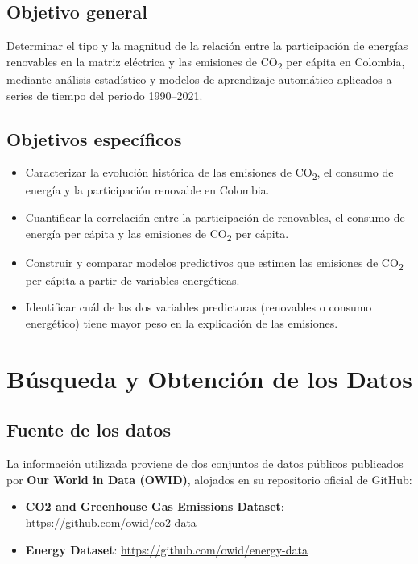 \documentclass[11pt]{article}
\begin{document}
\subsection*{Objetivo general}
Determinar el tipo y la magnitud de la relación entre la participación de energías renovables en la matriz eléctrica y las emisiones de CO\textsubscript{2} per cápita en Colombia, mediante análisis estadístico y modelos de aprendizaje automático aplicados a series de tiempo del periodo 1990--2021.

\subsection*{Objetivos específicos}
\begin{itemize}[leftmargin=1.2cm]
    \item Caracterizar la evolución histórica de las emisiones de CO\textsubscript{2}, el consumo de energía y la participación renovable en Colombia.
    \item Cuantificar la correlación entre la participación de renovables, el consumo de energía per cápita y las emisiones de CO\textsubscript{2} per cápita.
    \item Construir y comparar modelos predictivos que estimen las emisiones de CO\textsubscript{2} per cápita a partir de variables energéticas.
    \item Identificar cuál de las dos variables predictoras (renovables o consumo energético) tiene mayor peso en la explicación de las emisiones.
\end{itemize}

\section{Búsqueda y Obtención de los Datos}

\subsection*{Fuente de los datos}
La información utilizada proviene de dos conjuntos de datos públicos publicados por \textbf{Our World in Data (OWID)}, alojados en su repositorio oficial de GitHub:

\begin{itemize}[leftmargin=1.2cm]
    \item \textbf{CO2 and Greenhouse Gas Emissions Dataset}: \url{https://github.com/owid/co2-data}
    \item \textbf{Energy Dataset}: \url{https://github.com/owid/energy-data}
\end{itemize}
\end{document}

